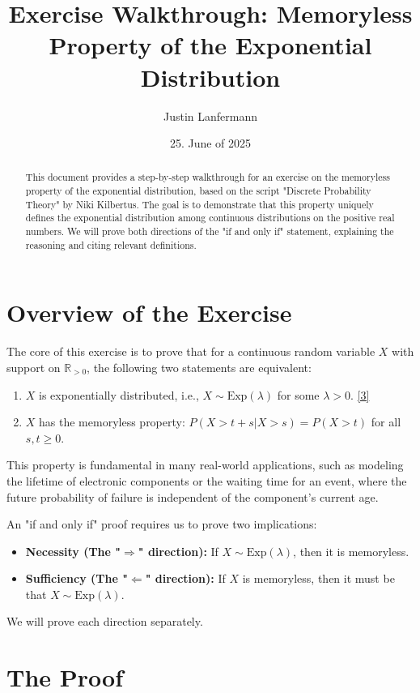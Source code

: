 \documentclass[11pt,a4paper]{article}
\title{Exercise Walkthrough: Memoryless Property of the Exponential Distribution}
\author{Justin Lanfermann}
\date{25. June of 2025}
\newcommand{\R}{\mathbb{R}} %
\begin{document}
\maketitle

\begin{abstract}
    This document provides a step-by-step walkthrough for an exercise on the memoryless property of the exponential distribution, based on the script "Discrete Probability Theory" by Niki Kilbertus. The goal is to demonstrate that this property uniquely defines the exponential distribution among continuous distributions on the positive real numbers. We will prove both directions of the "if and only if" statement, explaining the reasoning and citing relevant definitions.
\end{abstract}

\section{Overview of the Exercise}

The core of this exercise is to prove that for a continuous random variable $X$ with support on $\R_{>0}$, the following two statements are equivalent:
\begin{enumerate}
    \item $X$ is exponentially distributed, i.e., $X \sim \text{Exp}(\lambda)$ for some $\lambda > 0$. \hyperlink{note:exp}{[3]}
    \item $X$ has the memoryless property: $P(X > t + s | X > s) = P(X > t)$ for all $s, t \ge 0$.
\end{enumerate}
This property is fundamental in many real-world applications, such as modeling the lifetime of electronic components or the waiting time for an event, where the future probability of failure is independent of the component's current age.

An "if and only if" proof requires us to prove two implications:
\begin{itemize}
    \item \textbf{Necessity (The "$\Rightarrow$" direction):} If $X \sim \text{Exp}(\lambda)$, then it is memoryless.
    \item \textbf{Sufficiency (The "$\Leftarrow$" direction):} If $X$ is memoryless, then it must be that $X \sim \text{Exp}(\lambda)$.
\end{itemize}
We will prove each direction separately.

\section{The Proof}
\end{document}

